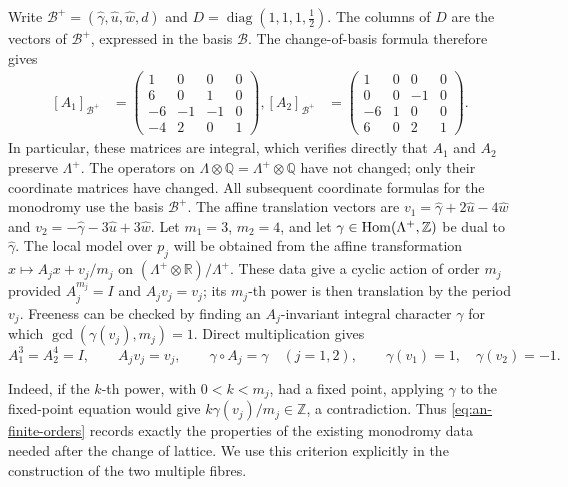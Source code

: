 Write $\mathcal B^+=(\widehat\gamma,\widehat u,\widehat w,d)$ and
$D=\operatorname{diag}(1,1,1,\tfrac12)$.
The columns of $D$ are the vectors of $\mathcal B^+$, expressed in
the basis $\mathcal B$.  The change-of-basis formula therefore gives
\begin{equation}\label{eq:an-monodromy-matrices}
 \begin{aligned}
 [A_1]_{\mathcal B^+}
 &
 =\begin{pmatrix}
  1&0&0&0\\
  6&0&1&0\\
  -6&-1&-1&0\\
  -4&2&0&1
 \end{pmatrix},
 [A_2]_{\mathcal B^+}
 &
 =\begin{pmatrix}
  1&0&0&0\\
  0&0&-1&0\\
  -6&1&0&0\\
  6&0&2&1
 \end{pmatrix}.
 \end{aligned}
\end{equation}
In particular, these matrices are integral, which verifies directly that
$A_1$ and $A_2$ preserve $\Lambda^+$.  The operators on
$\Lambda\otimes\mathbb Q=\Lambda^+\otimes\mathbb Q$ have not changed;
only their coordinate matrices have changed.  All subsequent coordinate
formulas for the monodromy use the basis $\mathcal B^+$.
The affine translation vectors are
$v_1=\widehat\gamma+2\widehat u-4\widehat w$ and
$v_2=-\widehat\gamma-3\widehat u+3\widehat w$.
Let $m_1=3$, $m_2=4$, and let
$\gamma\in\operatorname{Hom}(\Lambda^+,\mathbb Z)$ be dual to
$\widehat\gamma$.  The local model over $p_j$ will be obtained from the
affine transformation $x\longmapsto A_jx+v_j/m_j$ on
$(\Lambda^+\otimes\mathbb R)/\Lambda^+$.
These data give a cyclic action of order $m_j$ provided
$A_j^{m_j}=I$ and $A_jv_j=v_j$; its $m_j$-th power is then translation
by the period $v_j$.  Freeness can be checked by finding an
$A_j$-invariant integral character $\gamma$ for which
$\gcd(\gamma(v_j),m_j)=1$.  Direct multiplication gives
\begin{equation}\label{eq:an-finite-orders}
 A_1^3=A_2^4=I,
 \qquad A_jv_j=v_j,
 \qquad \gamma\circ A_j=\gamma\quad (j=1,2),
 \qquad \gamma(v_1)=1,\quad\gamma(v_2)=-1.
\end{equation}%

Indeed, if the $k$-th power, with $0<k<m_j$, had a fixed point, applying
$\gamma$ to the fixed-point equation would give
$k\gamma(v_j)/m_j\in\mathbb Z$, a contradiction.  Thus
\eqref{eq:an-finite-orders} records exactly the properties of the existing
monodromy data needed after the change of lattice.  We use this criterion
explicitly in the construction of the two multiple fibres.

